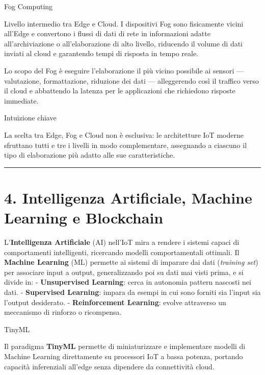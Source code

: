\documentclass[
  italian,
  openany]{book}
\begin{document}
\begin{calloutdefinition}{Fog Computing}

Livello intermedio tra Edge e Cloud. I dispositivi Fog sono fisicamente
vicini all'Edge e convertono i flussi di dati di rete in informazioni
adatte all'archiviazione o all'elaborazione di alto livello, riducendo
il volume di dati inviati al cloud e garantendo tempi di risposta in
tempo reale.

\end{calloutdefinition}

Lo scopo del Fog è eseguire l'elaborazione il più vicino possibile ai
sensori --- valutazione, formattazione, riduzione dei dati ---
alleggerendo così il traffico verso il cloud e abbattendo la latenza per
le applicazioni che richiedono risposte immediate.

\begin{callouttip}{Intuizione chiave}

La scelta tra Edge, Fog e Cloud non è esclusiva: le architetture IoT
moderne sfruttano tutti e tre i livelli in modo complementare,
assegnando a ciascuno il tipo di elaborazione più adatto alle sue
caratteristiche.

\end{callouttip}

\begin{center}\rule{0.5\linewidth}{0.5pt}\end{center}

\section{4. Intelligenza Artificiale, Machine Learning e
Blockchain}\label{intelligenza-artificiale-machine-learning-e-blockchain}

L'\textbf{Intelligenza Artificiale} (AI) nell'IoT mira a rendere i
sistemi capaci di comportamenti intelligenti, ricercando modelli
comportamentali ottimali. Il \textbf{Machine Learning} (ML) permette ai
sistemi di imparare dai dati (\emph{training set}) per associare input a
output, generalizzando poi su dati mai visti prima, e si divide in: -
\textbf{Unsupervised Learning}: cerca in autonomia pattern nascosti nei
dati. - \textbf{Supervised Learning}: impara da esempi in cui sono
forniti sia l'input sia l'output desiderato. - \textbf{Reinforcement
Learning}: evolve attraverso un meccanismo di rinforzo o ricompensa.

\begin{calloutnote}{TinyML}

Il paradigma \textbf{TinyML} permette di miniaturizzare e implementare
modelli di Machine Learning direttamente su processori IoT a bassa
potenza, portando capacità inferenziali all'edge senza dipendere da
connettività cloud.

\end{calloutnote}
\end{document}
